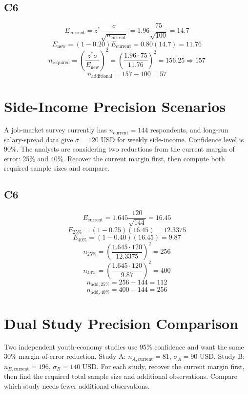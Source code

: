 \begin{ExamProblems}
		\subsection*{C6}
		\[
		E_{\text{current}} = z^*\frac{\sigma}{\sqrt{n_{\text{current}}}}
		= 1.96\frac{75}{\sqrt{100}}
		= 14.7
		\]
		\[
		E_{\text{new}} = (1-0.20)E_{\text{current}} = 0.80(14.7) = 11.76
		\]
		\[
		n_{\text{required}} = \left(\frac{z^*\sigma}{E_{\text{new}}}\right)^2
		= \left(\frac{1.96\cdot 75}{11.76}\right)^2
		= 156.25
		\Rightarrow 157
		\]
		\[
		n_{\text{additional}} = 157 - 100 = 57
		\]
		
		\item
		\section{Side-Income Precision Scenarios}
		A job-market survey currently has $n_{\text{current}} = 144$ respondents, and long-run salary-spread data give $\sigma = 120$ USD for weekly side-income. Confidence level is 90\%. The analysts are considering two reductions from the current margin of error: 25\% and 40\%. Recover the current margin first, then compute both required sample sizes and compare.
		
		\subsection*{C6}
		\[
		E_{\text{current}} = 1.645\frac{120}{\sqrt{144}} = 16.45
		\]
		\[
		E_{25\%} = (1-0.25)(16.45) = 12.3375
		\]
		\[
		E_{40\%} = (1-0.40)(16.45) = 9.87
		\]
		\[
		n_{25\%} = \left(\frac{1.645\cdot 120}{12.3375}\right)^2 = 256
		\]
		\[
		n_{40\%} = \left(\frac{1.645\cdot 120}{9.87}\right)^2 = 400
		\]
		\[
		n_{\text{add},25\%} = 256 - 144 = 112
		\]
		\[
		n_{\text{add},40\%} = 400 - 144 = 256
		\]
		
		\item
		\section{Dual Study Precision Comparison}
		Two independent youth-economy studies use 95\% confidence and want the same 30\% margin-of-error reduction.
		Study A: $n_{A,\text{current}} = 81$, $\sigma_A = 90$ USD.
		Study B: $n_{B,\text{current}} = 196$, $\sigma_B = 140$ USD.
		For each study, recover the current margin first, then find the required total sample size and additional observations. Compare which study needs fewer additional observations.
		

\end{ExamProblems}
